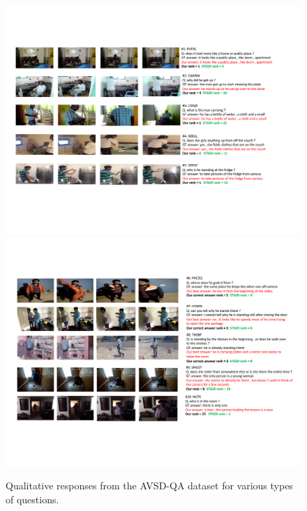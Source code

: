 \documentclass[letterpaper]{article} %
\begin{document}
\begin{figure}
    \centering
    \includegraphics[width=18cm,trim={1cm 4.5cm 1.5cm 3cm},clip]{./figs/quals_results_suppl_3.pdf}
    \includegraphics[width=18cm,trim={1.5cm 4cm 1.5cm 3cm},clip]{./figs/quals_results_suppl_4.pdf}
    \caption{Qualitative responses from the AVSD-QA dataset for various types of questions.}
    \label{fig:avsd-qa-more-quals-x}
\end{figure}
\clearpage

\end{document}
